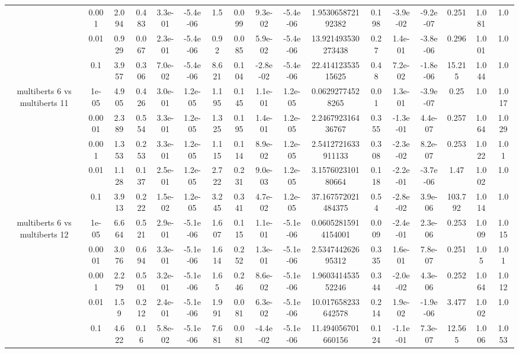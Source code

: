 \begin{tabular}{|c|c|c|c|c|c|c|c|c|c|c|c|c|c|c|c|c|}
 & 0.001 & 2.094 & 0.483 & 3.3e-01 & -5.4e-06 & 1.5 & 0.099 & 9.3e-02 & -5.4e-06 & 1.953065872192382 & 0.198 & -3.9e-02 & -9.2e-07 & 0.251 & 1.081 & 1.0 \\
 & 0.01 & 0.929 & 0.067 & 2.3e-01 & -5.4e-06 & 0.92 & 0.085 & 5.9e-02 & -5.4e-06 & 13.921493530273438 & 0.27 & 1.4e-01 & -3.8e-06 & 0.296 & 1.001 & 1.0 \\
 & 0.1 & 3.957 & 0.306 & 7.0e-02 & -5.4e-06 & 8.621 & 0.104 & -2.8e-02 & -5.4e-06 & 22.41412353515625 & 0.48 & 7.2e-02 & -1.8e-06 & 15.215 & 1.044 & 1.0 \\
\hline
\multirow{5}{*}{multiberts 6 vs multiberts 11} & 1e-05 & 4.905 & 0.426 & 3.0e-01 & 1.2e-05 & 1.195 & 0.145 & 1.1e-01 & 1.2e-05 & 0.06292774528265 & 0.01 & 1.3e-01 & -3.9e-07 & 0.25 & 1.0 & 1.017 \\
 & 0.0001 & 2.389 & 0.554 & 3.3e-01 & 1.2e-05 & 1.325 & 0.195 & 1.4e-01 & 1.2e-05 & 2.246792316436767 & 0.355 & -1.3e-01 & 4.4e-07 & 0.257 & 1.064 & 1.029 \\
 & 0.001 & 1.353 & 0.253 & 3.3e-01 & 1.2e-05 & 1.115 & 0.114 & 8.9e-02 & 1.2e-05 & 2.5412721633911133 & 0.308 & -2.3e-02 & 8.2e-07 & 0.253 & 1.022 & 1.01 \\
 & 0.01 & 1.128 & 0.137 & 2.5e-01 & 1.2e-05 & 2.722 & 0.231 & 9.0e-03 & 1.2e-05 & 3.157602310180664 & 0.118 & -2.2e-01 & -3.7e-06 & 1.47 & 1.002 & 1.0 \\
 & 0.1 & 3.913 & 0.222 & 1.5e-02 & 1.2e-05 & 3.245 & 0.341 & 4.7e-02 & 1.2e-05 & 37.167572021484375 & 0.54 & -2.8e-02 & 3.9e-06 & 103.792 & 1.014 & 1.0 \\
\hline
\multirow{5}{*}{multiberts 6 vs multiberts 12} & 1e-05 & 6.664 & 0.521 & 2.9e-01 & -5.1e-06 & 1.607 & 0.115 & 1.1e-01 & -5.1e-06 & 0.06052815914154001 & 0.009 & -2.4e-01 & 2.3e-06 & 0.253 & 1.009 & 1.015 \\
 & 0.0001 & 3.076 & 0.694 & 3.3e-01 & -5.1e-06 & 1.614 & 0.252 & 1.3e-01 & -5.1e-06 & 2.534744262695312 & 0.335 & 1.6e-01 & 7.8e-07 & 0.251 & 1.05 & 1.01 \\
 & 0.001 & 2.279 & 0.501 & 3.2e-01 & -5.1e-06 & 1.65 & 0.246 & 8.6e-02 & -5.1e-06 & 1.960341453552246 & 0.344 & -2.0e-02 & 4.3e-06 & 0.252 & 1.064 & 1.012 \\
 & 0.01 & 1.59 & 0.212 & 2.4e-01 & -5.1e-06 & 1.991 & 0.081 & 6.3e-02 & -5.1e-06 & 10.017658233642578 & 0.214 & 1.9e-02 & -1.9e-06 & 3.477 & 1.002 & 1.0 \\
 & 0.1 & 4.622 & 0.16 & 5.8e-02 & -5.1e-06 & 7.681 & 0.081 & -4.4e-02 & -5.1e-06 & 11.494056701660156 & 0.124 & -1.1e-01 & 7.3e-07 & 12.565 & 1.006 & 1.053 \\

\end{tabular}
